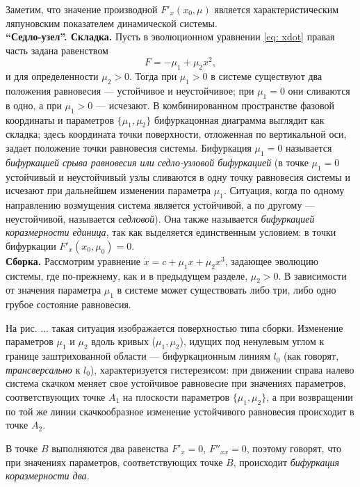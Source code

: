 Заметим, что значение производной $F'_{x}(x_{0}, \mu)$ является характеристическим ляпуновским показателем динамической системы.\\
\textbf{``Седло-узел''. Складка.} Пусть в эволюционном уравнении \eqref{eq: xdot} правая часть задана равенством
\begin{equation*}
    F = -\mu_{1} + \mu_{2}x^{2},
\end{equation*}
и для определенности $\mu_{2} > 0$. Тогда при $\mu_{1} > 0$ в системе существуют два положения равновесия --- устойчивое и неустойчивое; при $\mu_{1} = 0$ они сливаются в одно, а при $\mu_{1} > 0$ --- исчезают. В комбинированном пространстве фазовой координаты и параметров $\{\mu_{1}, \mu_{2}\}$ бифуркацонная диаграмма выглядит как складка; здесь координата точки поверхности, отложенная по вертикальной оси, задает положение точки равновесия системы. Бифуркация $\mu_{1} = 0$ называется \textit{бифуркацией срыва равновесия или седло-узловой бифуркацией} (в точке $\mu_{1} = 0$ устойчивый и неустойчивый узлы сливаются в одну точку равновесия системы и исчезают при дальнейшем изменении параметра $\mu_{1}$. Ситуация, когда по одному направлению возмущения система является устойчивой, а по другому --- неустойчивой, называется \textit{седловой}). Она также называется \textit{бифуркацией коразмерности единица}, так как выделяется единственным условием: в точки бифуркации $F'_{x}(x_{0}, \mu_{0}) = 0$.\\
\textbf{Сборка.} Рассмотрим уравнение $\dot{x} = c + \mu_{1}x + \mu_{2} x^{3}$, задающее эволюцию системы, где по-прежнему, как и в предыдущем разделе, $\mu_{2} > 0$. В зависимости от значения параметра $\mu_{1}$ в системе может существовать либо три, либо одно грубое состояние равновесия.

На рис. ... такая ситуация изображается поверхностью типа сборки. Изменение параметров $\mu_{1}$ и $\mu_{2}$ вдоль кривых ($\mu_{1},\mu_{2}$), идущих под ненулевым углом к границе заштрихованной области --- бифуркационным линиям $l_{0}$ (как говорят, \textit{трансверсально} к $l_{0}$), характеризуется гистерезисом: при движении справа налево система скачком меняет свое устойчивое равновесие при значениях параметров, соответствующих точке $A_{1}$ на плоскости параметров $\{\mu_{1}, \mu_{2}\}$, а при возвращении по той же линии скачкообразное изменение устойчивого равновесия происходит в точке $A_{2}$.

В точке $B$ выполняются два равенства $F'_{x} = 0$, $F''_{xx} = 0$, поэтому говорят, что при значениях параметров, соответствующих точке $B$, происходит \textit{бифуркация коразмерности два}.

